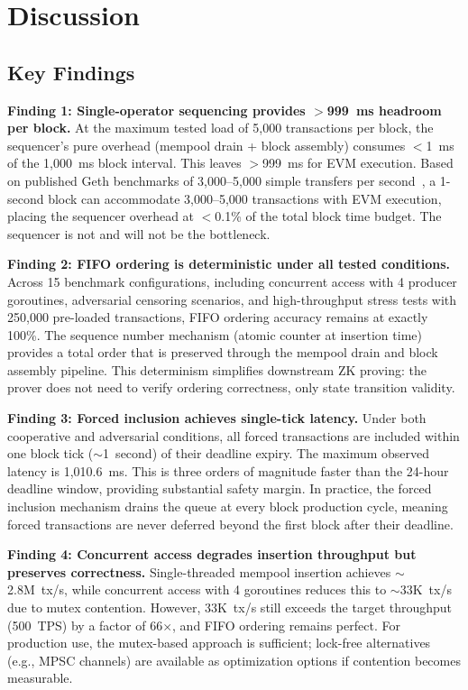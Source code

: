 
\section{Discussion}

\subsection{Key Findings}

\textbf{Finding 1: Single-operator sequencing provides $>$999~ms headroom per block.}
At the maximum tested load of 5{,}000 transactions per block, the sequencer's pure
overhead (mempool drain + block assembly) consumes $<$1~ms of the 1{,}000~ms block
interval. This leaves $>$999~ms for EVM execution. Based on published Geth benchmarks
of 3{,}000--5{,}000 simple transfers per second~\cite{geth2024tracing}, a 1-second
block can accommodate 3{,}000--5{,}000 transactions with EVM execution, placing the
sequencer overhead at $<$0.1\% of the total block time budget. The sequencer is not
and will not be the bottleneck.

\textbf{Finding 2: FIFO ordering is deterministic under all tested conditions.}
Across 15 benchmark configurations, including concurrent access with 4 producer
goroutines, adversarial censoring scenarios, and high-throughput stress tests with
250{,}000 pre-loaded transactions, FIFO ordering accuracy remains at exactly 100\%.
The sequence number mechanism (atomic counter at insertion time) provides a total
order that is preserved through the mempool drain and block assembly pipeline.
This determinism simplifies downstream ZK proving: the prover does not need to
verify ordering correctness, only state transition validity.

\textbf{Finding 3: Forced inclusion achieves single-tick latency.}
Under both cooperative and adversarial conditions, all forced transactions are included
within one block tick (${\sim}$1~second) of their deadline expiry. The maximum observed
latency is 1{,}010.6~ms. This is three orders of magnitude faster than the 24-hour
deadline window, providing substantial safety margin. In practice, the forced inclusion
mechanism drains the queue at every block production cycle, meaning forced transactions
are never deferred beyond the first block after their deadline.

\textbf{Finding 4: Concurrent access degrades insertion throughput but preserves correctness.}
Single-threaded mempool insertion achieves ${\sim}$2.8M~tx/s, while concurrent access
with 4 goroutines reduces this to ${\sim}$33K~tx/s due to mutex contention. However,
33K~tx/s still exceeds the target throughput (500~TPS) by a factor of 66$\times$, and
FIFO ordering remains perfect. For production use, the mutex-based approach is sufficient;
lock-free alternatives (e.g., MPSC channels) are available as optimization options if
contention becomes measurable.

